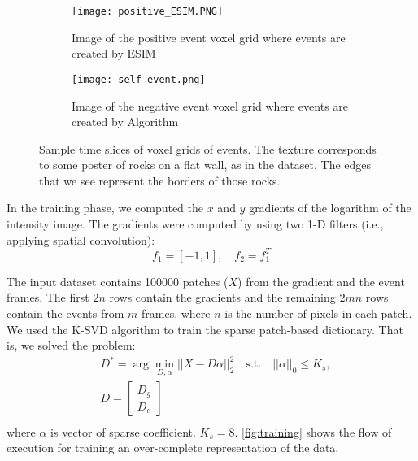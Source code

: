 \documentclass[10pt]{report}
\begin{document}
\begin{figure}
\centering
\begin{subfigure}{.45\linewidth}
  \centering
  \texttt{[image: positive\_ESIM.PNG]}
  \caption{Image of the positive event voxel grid where events are created by ESIM}
  \label{fig:positive event}
\end{subfigure}\;\;
\begin{subfigure}{.45\linewidth}
  \centering
  \texttt{[image: self\_event.png]}
  \caption{Image of the negative event voxel grid where events are created by Algorithm}
  \label{fig:negative_event}
\end{subfigure}
\caption{Sample time slices of voxel grids of events. 
The texture corresponds to some poster of rocks on a flat wall, as in the \cite{Mueggler17ijrr} dataset. 
The edges that we see represent the borders of those rocks.}
\label{fig:events}
\end{figure}

In the training phase, we computed the $x$ and $y$ gradients of the logarithm of the intensity image. 
The gradients were computed by using two 1-D filters (i.e., applying spatial convolution):
\begin{equation}
    f_{1} = [-1, 1],\quad f_{2} = f_{1}^{T}
\end{equation}

The input dataset contains 100000 patches ($X$) from the gradient and the event frames. 
The first $2n$ rows contain the gradients and the remaining $2mn$ rows contain the events from $m$ frames, where $n$ is the number of pixels in each patch. 
We used the K-SVD algorithm \cite{Aharon06tsp} to train the sparse patch-based dictionary.
That is, we solved the problem:
\begin{equation*}
  \begin{aligned}
    &D^{\ast} = \arg \min_{D,\alpha} || X - D \alpha ||_{2}^{2} \quad\text{s.t.}\quad ||\alpha ||_{0} \leq K_{s},\\
    &D = \begin{bmatrix} D_{g} \\ D_{e} \end{bmatrix}\\
 \end{aligned}
\end{equation*}
where $\alpha$ is vector of sparse coefficient. $K_{s} = 8$. 
\autoref{fig:training} shows the flow of execution for training an over-complete representation of the data.
\end{document}
